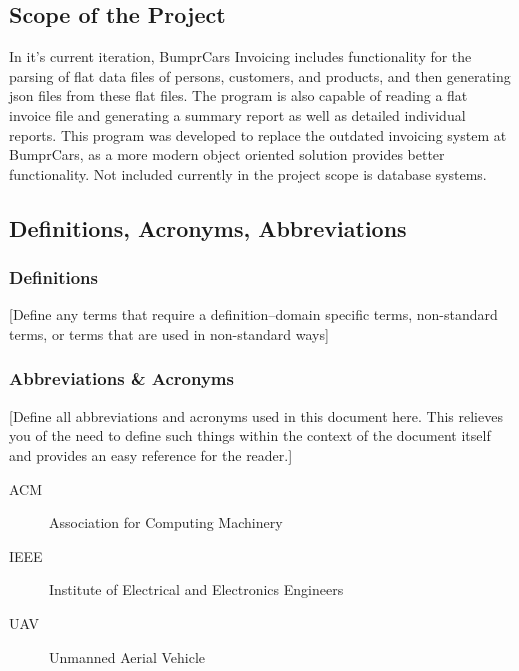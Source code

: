 \documentclass[12pt]{scrartcl} %
\begin{document}
\subsection{Scope of the Project}

In it's current iteration, BumprCars Invoicing includes functionality for the parsing of flat data files of persons, customers, and products, and then generating json files from these flat files. The program is also capable of reading a flat invoice file and generating a summary report as well as detailed individual reports. This program was developed to replace the outdated invoicing system at BumprCars, as a more modern object oriented solution provides better functionality. Not included currently in the project scope is database systems. 


\subsection{Definitions, Acronyms, Abbreviations}

\subsubsection{Definitions}

[Define any terms that require a definition--domain specific terms, non-standard terms, or terms that are used in non-standard ways]

\subsubsection{Abbreviations \& Acronyms}

[Define all abbreviations and acronyms used in this document here.  This relieves you of the need to define such things within the context of the document itself and provides an easy reference for the reader.]

\begin{description}
  \item[ACM] Association for Computing Machinery
  \item[IEEE] Institute of Electrical and Electronics Engineers
  \item[UAV] Unmanned Aerial Vehicle
\end{description}
  
\end{document}
